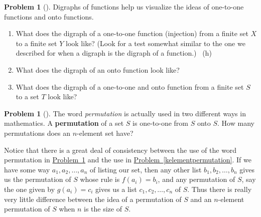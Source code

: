 \documentclass[10pt,]{book}
\newcommand{\terminology}[1]{\textbf{#1}}
\theoremstyle{plain}
\theoremstyle{definition}
\newtheorem{activity}[project]{Problem}
\theoremstyle{definition}
\numberwithin{equation}{chapter}
\begin{document}
\begin{activity}[] \label{activity-26}
\hypertarget{p-135}{}%
Digraphs of functions help us visualize the ideas of one-to-one functions and onto functions.%
\begin{enumerate}[font=\bfseries,label=(\alph*),ref=\alph*]
\item\label{task-18} \marginsymbol[-2.5em]{} \hypertarget{p-136}{}%
What does the digraph of a one-to-one function (injection) from a finite set \(X\) to a finite set \(Y\) look like? (Look for a test somewhat similar to the one we described for when a digraph is the digraph of a function.)%
~{\tiny (h)}\item\label{task-19} \marginsymbol[-2.5em]{} \hypertarget{p-139}{}%
What does the digraph of an onto function look like?%
\item\label{bijectiondigraph} \marginsymbol[-2.5em]{} \hypertarget{p-141}{}%
What does the digraph of a one-to-one and onto function from a finite set \(S\) to a set \(T\) look like?%
\end{enumerate}
\end{activity}
\begin{activity}[] \label{permutationasbijection}
\hypertarget{p-143}{}%
The word \emph{permutation} is actually used in two different ways in mathematics. A \terminology{permutation} of a set \(S\) is one-to-one from \(S\) onto \(S\). How many permutations does an \(n\)-element set have?%
\end{activity}
\hypertarget{p-145}{}%
Notice that there is a great deal of consistency between the use of the word permutation in \hyperref[permutationasbijection]{Problem~\ref{permutationasbijection}} and the use in \hyperref[kelementpermutation]{Problem~\ref{kelementpermutation}}. If we have some way \(a_1,a_2,\ldots,a_n\) of listing our set, then any other list \(b_1,b_2,\ldots,b_n\) gives us the permutation of \(S\) whose rule is \(f(a_i) =b_i\), and any permutation of \(S\), say the one given by \(g(a_i)=c_i\) gives us a list \(c_1,c_2,\ldots,c_n\) of \(S\). Thus there is really very little difference between the idea of a permutation of \(S\) and an \(n\)-element permutation of \(S\) when \(n\) is the size of \(S\).%
\typeout{************************************************}
\typeout{************************************************}
\end{document}
